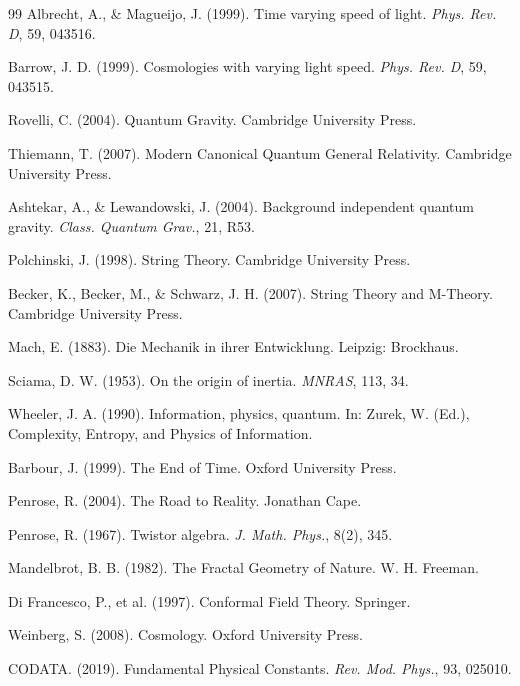 \begin{thebibliography}{99}
		Albrecht, A., \& Magueijo, J. (1999). Time varying speed of light. \emph{Phys. Rev. D}, 59, 043516.
		
		Barrow, J. D. (1999). Cosmologies with varying light speed. \emph{Phys. Rev. D}, 59, 043515.
		
		Rovelli, C. (2004). Quantum Gravity. Cambridge University Press.
		
		Thiemann, T. (2007). Modern Canonical Quantum General Relativity. Cambridge University Press.
		
		Ashtekar, A., \& Lewandowski, J. (2004). Background independent quantum gravity. \emph{Class. Quantum Grav.}, 21, R53.
		
		Polchinski, J. (1998). String Theory. Cambridge University Press.
		
		Becker, K., Becker, M., \& Schwarz, J. H. (2007). String Theory and M-Theory. Cambridge University Press.
		
		Mach, E. (1883). Die Mechanik in ihrer Entwicklung. Leipzig: Brockhaus.
		
		Sciama, D. W. (1953). On the origin of inertia. \emph{MNRAS}, 113, 34.
		
		Wheeler, J. A. (1990). Information, physics, quantum. In: Zurek, W. (Ed.), Complexity, Entropy, and Physics of Information.
		
		Barbour, J. (1999). The End of Time. Oxford University Press.
		
		Penrose, R. (2004). The Road to Reality. Jonathan Cape.
		
		Penrose, R. (1967). Twistor algebra. \emph{J. Math. Phys.}, 8(2), 345.
		
		Mandelbrot, B. B. (1982). The Fractal Geometry of Nature. W. H. Freeman.
		
		Di Francesco, P., et al. (1997). Conformal Field Theory. Springer.
		
		Weinberg, S. (2008). Cosmology. Oxford University Press.
		
		CODATA. (2019). Fundamental Physical Constants. \emph{Rev. Mod. Phys.}, 93, 025010.
		

\end{thebibliography}
